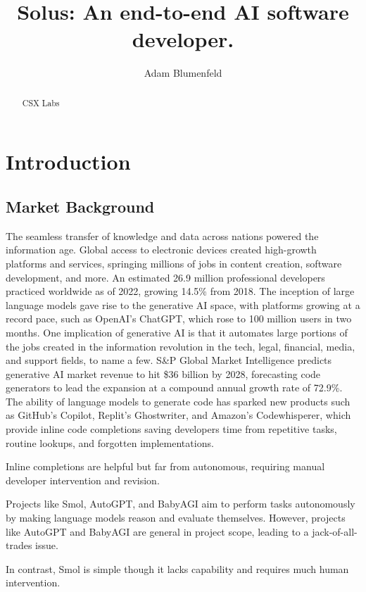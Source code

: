 \documentclass[a4paper,twocolumn,11pt,accepted=2017-05-09]{quantumarticle}
\begin{document}
\title{Solus: An end-to-end AI software developer.}

\author{Adam Blumenfeld}
\maketitle

\begin{abstract}
  CSX Labs
\end{abstract}
\section{Introduction}
\subsection{Market Background}
The seamless transfer of knowledge and data across nations powered the information age. Global access to electronic devices created high-growth platforms and services, springing millions of jobs in content creation, software development, and more. An estimated 26.9 million professional developers practiced worldwide as of 2022, growing 14.5\% from 2018\cite{Qubit2022How}. The inception of large language models gave rise to the generative AI space, with platforms growing at a record pace, such as OpenAI's ChatGPT, which rose to 100 million users in two months\cite{Carr2023ChatGPT}. One implication of generative AI is that it automates large portions of the jobs created in the information revolution in the tech, legal, financial, media, and support fields, to name a few\cite{Mok2023ChatGPT}. S\&P Global Market Intelligence predicts generative AI market revenue to hit \$36 billion by 2028, forecasting code generators to lead the expansion at a compound annual growth rate of 72.9\%\cite{Park2023Generative}. The ability of language models to generate code has sparked new products such as GitHub's Copilot\cite{Dohmke2022GitHub}, Replit's Ghostwriter\cite{Masad2022Ghostwriter}, and Amazon's Codewhisperer\cite{Engdahl2023Amazon}, which provide inline code completions saving developers time from repetitive tasks, routine lookups, and forgotten implementations.

Inline completions are helpful but far from autonomous, requiring manual developer intervention and revision.

Projects like Smol\cite{Osika2023Current}, AutoGPT\cite{Ortiz2023What}, and BabyAGI\cite{Parthasarathy2023Meet} aim to perform tasks autonomously by making language models reason and evaluate themselves. However, projects like AutoGPT and BabyAGI are general in project scope, leading to a jack-of-all-trades issue.

In contrast, Smol is simple though it lacks capability and requires much human intervention.


\end{document}
